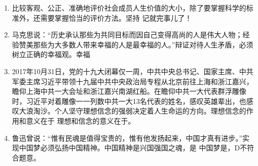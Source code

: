 \begin{enumerate}[align=hang, start=1]
	\item 
	比较客观、公正、准确地评价社会成员人生价值的大小，除了要掌握科学的标准外，还需要掌握恰当的评价方法。坚持
	\note 记就完事儿了！
	
	\item 
	马克思说：``历史承认那些为共同目标而因自己变得高尚的人是伟大人物；经验赞美那些为大多数人带来幸福的人是最幸福的人。''辩证对待人生矛盾，必须树立正确的幸福观。幸福
	\note {}
	
	\item 
	2017年10月31日，党的十九大闭幕仅一周，中共中央总书记、国家主席、中共军委主席习近平带领十九届中共中央政治局专程从北京前往上海和浙江嘉兴，瞻仰上海中共一大会址和浙江嘉兴南湖红船。在瞻仰中共一大代表群浮雕像时，习近平对着雕像一一列数中共一大13名代表的姓名，感叹英雄辈出，也感叹大浪淘沙。个人坚守理想信念的强弱决定着人生命运的方向。理想信念的作用和意义在于
	\note 理想和信念的意义在于。
	
	\item 
	鲁迅曾说：``惟有民魂是值得宝贵的，惟有他发扬起来，中国才真有进步。''实现中国梦必须弘扬中国精神。中国精神是兴国强国之魂，是
	\note 中国梦是，D不符合题意。
	
	
\end{enumerate}

